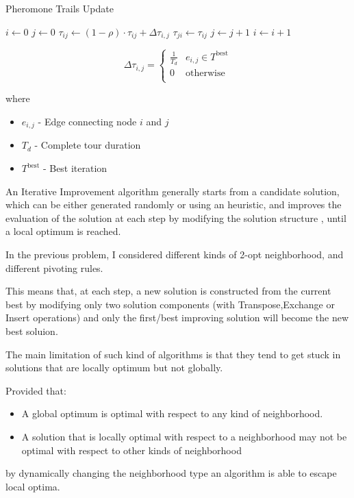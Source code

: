 \begin{homeworkProblem}
\begin{algorithm}[!h]
  \caption{Pheromone Trails Update}\label{update}
  \begin{algorithmic}[1]
     \State $i \gets 0$
      \State $j \gets 0$
          \State $\tau_{ij} \gets (1-\rho)\cdot\tau_{ij}+\Delta\tau_{i,j}$
          \State $\tau_{ji} \gets \tau_{ij}$
          \State $ j \gets j + 1$  
        \EndFor
        \State $ i \gets i + 1$ 
      \EndFor
    \EndProcedure
\end{algorithmic}
\end{algorithm} 

\begin{equation}
  \Delta\tau_{i,j} = \begin{cases}
    \frac{1}{T_d} & e_{i,j} \in T^{\text{best}}  \\
    0 & \text{otherwise} \\
  \end{cases}
\end{equation}

where
\begin{itemize}
\item $e_{i,j}$ - Edge connecting node $i$ and $j$
\item $T_d$ - Complete tour duration
\item $T^{\text{best}}$ - Best iteration 
\end{itemize}


 
An Iterative Improvement algorithm generally starts from a candidate solution, which can be either generated randomly or using an heuristic, and improves the evaluation of the solution at each step by modifying the solution structure , until a local optimum is reached.

In the previous problem, I considered different kinds of 2-opt neighborhood, and different pivoting rules.

This means that, at each step, a new solution is constructed from the current best by modifying only two solution components (with Transpose,Exchange or Insert operations) and only the first/best improving solution will become the new best soluion.

The main limitation of such kind of algorithms is that they tend to get stuck in solutions that are locally optimum but not globally.

Provided that:
\begin{itemize}
\item A global optimum is optimal with respect to any kind of neighborhood. 
\item A solution that is locally optimal with respect to a neighborhood may not be optimal with respect to other kinds of neighborhood
\end{itemize}
by dynamically changing the neighborhood type an algorithm is able to escape local optima.


\end{homeworkProblem}
